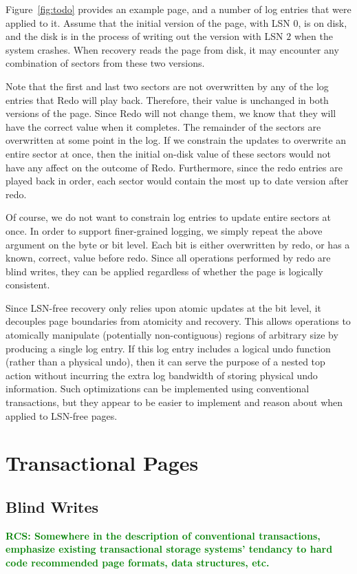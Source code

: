 \documentclass[letterpaper,twocolumn,10pt]{article}
\newcommand{\rcs}[1]{\textcolor{green}{\bf RCS: #1}}
\begin{document}
Figure~\ref{fig:todo} provides an example page, and a number of log
entries that were applied to it.  Assume that the initial version of
the page, with LSN $0$, is on disk, and the disk is in the process of
writing out the version with LSN $2$ when the system crashes.  When
recovery reads the page from disk, it may encounter any combination of
sectors from these two versions.

Note that the first and last two sectors are not overwritten by any
of the log entries that Redo will play back.  Therefore, their value
is unchanged in both versions of the page.  Since Redo will not change
them, we know that they will have the correct value when it completes.
The remainder of the sectors are overwritten at some point in the log.
If we constrain the updates to overwrite an entire sector at once, then
the initial on-disk value of these sectors would not have any affect
on the outcome of Redo.  Furthermore, since the redo entries are
played back in order, each sector would contain the most up to date
version after redo.

Of course, we do not want to constrain log entries to update entire
sectors at once.  In order to support finer-grained logging, we simply
repeat the above argument on the byte or bit level.  Each bit is
either overwritten by redo, or has a known, correct, value before
redo.  Since all operations performed by redo are blind writes, they
can be applied regardless of whether the page is logically consistent.

Since LSN-free recovery only relies upon atomic updates at the bit
level, it decouples page boundaries from atomicity and recovery.  
This allows operations to atomically manipulate
(potentially non-contiguous) regions of arbitrary size by producing a
single log entry.  If this log entry includes a logical undo function
(rather than a physical undo), then it can serve the purpose of a
nested top action without incurring the extra log bandwidth of storing
physical undo information.  Such optimizations can be implemented
using conventional transactions, but they appear to be easier to
implement and reason about when applied to LSN-free pages.

\section{Transactional Pages}

\subsection{Blind Writes}
\label{sec:blindWrites}
\rcs{Somewhere in the description of conventional transactions, emphasize existing transactional storage systems' tendancy to hard code recommended page formats, data structures, etc.}
\end{document}
